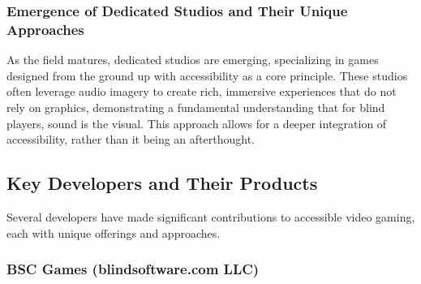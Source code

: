 \subsubsection{Emergence of Dedicated Studios and Their Unique Approaches}

As the field matures, dedicated studios are emerging, specializing in games designed from the ground up with accessibility as a core principle. These studios often leverage audio imagery to create rich, immersive experiences that do not rely on graphics, demonstrating a fundamental understanding that for blind players, sound is the visual\supercite{DigitalStorm2025}. This approach allows for a deeper integration of accessibility, rather than it being an afterthought.

\subsection{Key Developers and Their Products}

Several developers have made significant contributions to accessible video gaming, each with unique offerings and approaches.

\subsubsection{BSC Games (blindsoftware.com LLC)}

